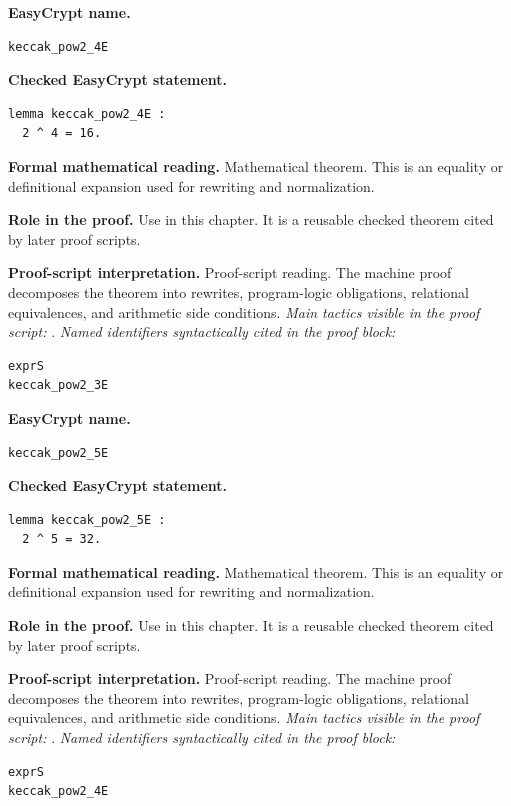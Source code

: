 \begin{formaltheorem}
\noindent\textbf{EasyCrypt name.}
\begin{lstlisting}[language=EasyCrypt,basicstyle=\ttfamily\scriptsize]
keccak_pow2_4E
\end{lstlisting}
\noindent\textbf{Checked EasyCrypt statement.}
\begin{lstlisting}[language=EasyCrypt,basicstyle=\ttfamily\scriptsize]
lemma keccak_pow2_4E :
  2 ^ 4 = 16.
\end{lstlisting}
\noindent\textbf{Formal mathematical reading.}
Mathematical theorem. This is an equality or definitional expansion used for rewriting and normalization.

\noindent\textbf{Role in the proof.}
Use in this chapter. It is a reusable checked theorem cited by later proof scripts.

\noindent\textbf{Proof-script interpretation.}
Proof-script reading. The machine proof decomposes the theorem into rewrites, program-logic obligations, relational equivalences, and arithmetic side conditions.
\emph{Main tactics visible in the proof script:} .
\emph{Named identifiers syntactically cited in the proof block:}
\begin{lstlisting}[language=EasyCrypt,basicstyle=\ttfamily\scriptsize]
exprS
keccak_pow2_3E
\end{lstlisting}

\end{formaltheorem}

\begin{formaltheorem}
\noindent\textbf{EasyCrypt name.}
\begin{lstlisting}[language=EasyCrypt,basicstyle=\ttfamily\scriptsize]
keccak_pow2_5E
\end{lstlisting}
\noindent\textbf{Checked EasyCrypt statement.}
\begin{lstlisting}[language=EasyCrypt,basicstyle=\ttfamily\scriptsize]
lemma keccak_pow2_5E :
  2 ^ 5 = 32.
\end{lstlisting}
\noindent\textbf{Formal mathematical reading.}
Mathematical theorem. This is an equality or definitional expansion used for rewriting and normalization.

\noindent\textbf{Role in the proof.}
Use in this chapter. It is a reusable checked theorem cited by later proof scripts.

\noindent\textbf{Proof-script interpretation.}
Proof-script reading. The machine proof decomposes the theorem into rewrites, program-logic obligations, relational equivalences, and arithmetic side conditions.
\emph{Main tactics visible in the proof script:} .
\emph{Named identifiers syntactically cited in the proof block:}
\begin{lstlisting}[language=EasyCrypt,basicstyle=\ttfamily\scriptsize]
exprS
keccak_pow2_4E
\end{lstlisting}

\end{formaltheorem}

